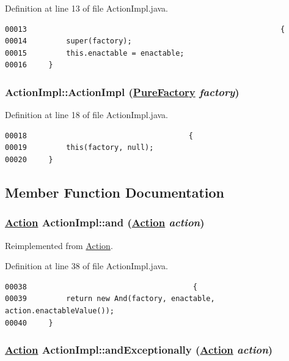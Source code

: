 Definition at line 13 of file Action\-Impl.java.\footnotesize\begin{verbatim}00013                                                          {
00014         super(factory);
00015         this.enactable = enactable;
00016     }
\end{verbatim}\normalsize 
\hypertarget{classActionImpl_c3}{
\subsubsection[ActionImpl]{\setlength{\rightskip}{0pt plus 5cm}Action\-Impl::Action\-Impl (\hyperlink{classPureFactory}{Pure\-Factory} {\em factory})}}
\label{classActionImpl_c3}




Definition at line 18 of file Action\-Impl.java.\footnotesize\begin{verbatim}00018                                     {
00019         this(factory, null);
00020     }
\end{verbatim}\normalsize 


\subsection{Member Function Documentation}
\hypertarget{classActionImpl_a14}{
\subsubsection[and]{\setlength{\rightskip}{0pt plus 5cm}\hyperlink{interfaceAction}{Action} Action\-Impl::and (\hyperlink{interfaceAction}{Action} {\em action})}}
\label{classActionImpl_a14}




Reimplemented from \hyperlink{interfaceAction_a4}{Action}.

Definition at line 38 of file Action\-Impl.java.\footnotesize\begin{verbatim}00038                                      {
00039         return new And(factory, enactable, action.enactableValue());
00040     }
\end{verbatim}\normalsize 
\hypertarget{classActionImpl_a16}{
\subsubsection[andExceptionally]{\setlength{\rightskip}{0pt plus 5cm}\hyperlink{interfaceAction}{Action} Action\-Impl::and\-Exceptionally (\hyperlink{interfaceAction}{Action} {\em action})}}
\label{classActionImpl_a16}




